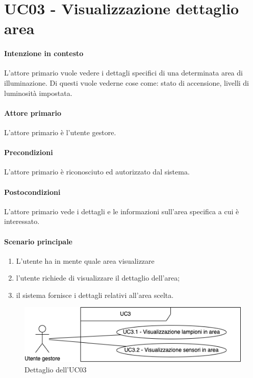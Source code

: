 \section{UC03 - Visualizzazione dettaglio area}\label{uc:03}
\paragraph{Intenzione in contesto} L'attore primario vuole vedere i dettagli specifici di una determinata area di illuminazione. Di questi vuole vederne cose come: stato di accensione, livelli di luminosità impostata.

\paragraph{Attore primario} L'attore primario è l'utente gestore.

\paragraph{Precondizioni} L'attore primario è riconosciuto ed autorizzato dal sistema.

\paragraph{Postocondizioni} L'attore primario vede i dettagli e le informazioni sull'area specifica a cui è interessato.

\paragraph{Scenario principale}

\begin{enumerate}
    \item L'utente ha in mente quale area visualizzare
    \item l'utente richiede di visualizzare il dettaglio dell'area;
    \item il sistema fornisce i dettagli relativi all'area scelta.
\end{enumerate}

\begin{figure}[h]
    \includegraphics[width=\textwidth]{contenuti/img/casi_uso_grafici-uc3.png}
    \caption{Dettaglio dell'UC03}
    \label{fig:uc03}
\end{figure}

